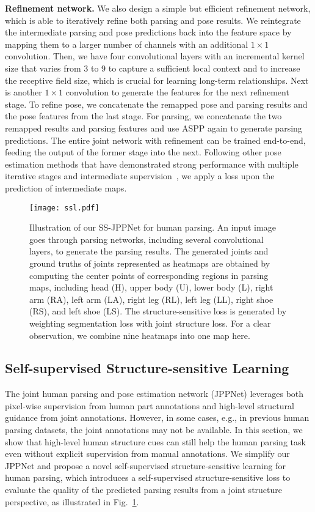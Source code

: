 \documentclass[10pt,journal,compsoc]{IEEEtran}
\begin{document}
\textbf{Refinement network.}
We also design a simple but efficient refinement network, which is able to iteratively refine both parsing and pose results. We reintegrate the intermediate parsing and pose predictions back into the feature space by mapping them to a larger number of channels with an additional $1\times1$ convolution. Then, we have four convolutional layers with an incremental kernel size that varies from 3 to 9 to capture a sufficient local context and to increase the receptive field size, which is crucial for learning long-term relationships. Next is another $1\times1$ convolution to generate the features for the next refinement stage. To refine pose, we concatenate the remapped pose and parsing results and the pose features from the last stage. For parsing, we concatenate the two remapped results and parsing features and use ASPP again to generate parsing predictions. The entire joint network with refinement can be trained end-to-end, feeding the output of the former stage into the next. Following other pose estimation methods that have demonstrated strong performance with multiple iterative stages and intermediate supervision~\cite{Wei_2016_CVPR,newell2016stacked,carreira2016human}, we apply a loss upon the prediction of intermediate maps.



\begin{figure}[t]
\centering
   \texttt{[image: ssl.pdf]}
\vspace{-7mm}
\caption{Illustration of our SS-JPPNet for human parsing. An input image goes through parsing networks, including several convolutional layers, to generate the parsing results. The generated joints and ground truths of joints represented as heatmaps are obtained by computing the center points of corresponding regions in parsing maps, including head (H), upper body (U), lower body (L), right arm (RA), left arm (LA), right leg (RL), left leg (LL), right shoe (RS), and left shoe (LS). The structure-sensitive loss is generated by weighting segmentation loss with joint structure loss. For a clear observation,  we combine nine heatmaps into one map here.}
\vspace{-2mm}
\label{fig:ss_jppnet}
\end{figure}

\subsection{Self-supervised Structure-sensitive Learning}
The joint human parsing and pose estimation network (JPPNet) leverages both pixel-wise supervision from human part annotations and high-level structural guidance from joint annotations. However, in some cases, e.g., in previous human parsing datasets, the joint annotations may not be available. In this section, we show that high-level human structure cues can still help the human parsing task even without explicit supervision from manual annotations. We simplify our JPPNet and propose a novel self-supervised structure-sensitive learning for human parsing, which introduces a self-supervised structure-sensitive loss to evaluate the quality of the predicted parsing results from a joint structure perspective, as illustrated in Fig.~\ref{fig:ss_jppnet}.
\end{document}
